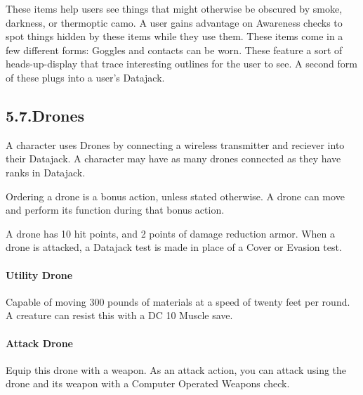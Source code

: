 \documentclass{article}
\begin{document}
\noindent{}These items help users see things that might otherwise be obscured by smoke, darkness, or thermoptic camo. A user gains advantage on Awareness checks to spot things hidden by these items while they use them. These items come in a few different forms: Goggles and contacts can be worn. These feature a sort of heads-up-display that trace interesting outlines for the user to see. A second form of these plugs into a user's Datajack.%

\subsection{5.7.\hspace*{0.5em}Drones}\label{sec-drones}%

\noindent{}A character uses Drones by connecting a wireless transmitter and reciever into their Datajack. A character may have as many drones connected as they have ranks in Datajack.%

Ordering a drone is a bonus action, unless stated otherwise. A drone can move and perform its function during that bonus action.%

A drone has 10 hit points, and 2 points of damage reduction armor. When a drone is attacked, a Datajack test is made in place of a Cover or Evasion test.%

\paragraph{Utility Drone}\label{sec-utility-drone}%

\noindent{}Capable of moving 300 pounds of materials at a speed of twenty feet per round. A creature can resist this with a DC 10 Muscle save.%

\paragraph{Attack Drone}\label{sec-attack-drone}%

\noindent{}Equip this drone with a weapon. As an attack action, you can attack using the drone and its weapon with a Computer Operated Weapons check.%
\end{document}
